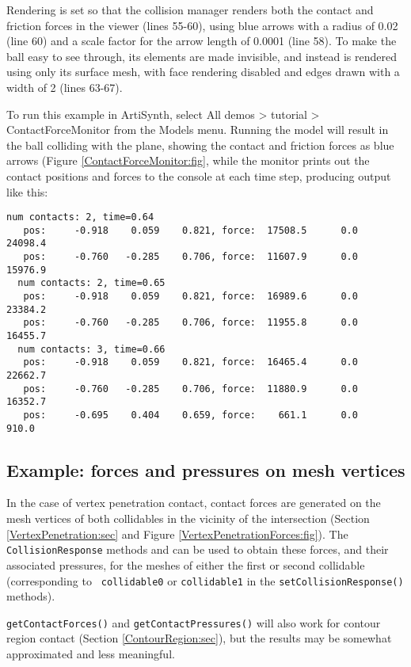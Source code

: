 Rendering is set so that the collision manager renders both the
contact and friction forces in the viewer (lines 55-60), using blue
arrows with a radius of 0.02 (line 60) and a scale factor for the
arrow length of 0.0001 (line 58). To make the ball easy to see
through, its elements are made invisible, and instead is rendered
using only its surface mesh, with face rendering disabled and edges
drawn with a width of 2 (lines 63-67).

To run this example in ArtiSynth, select {\sf All demos > tutorial >
ContactForceMonitor} from the {\sf Models} menu. Running the model
will result in the ball colliding with the plane, showing the contact
and friction forces as blue arrows
(Figure \ref{ContactForceMonitor:fig}, while the monitor prints out
the contact positions and forces to the console at each time step,
producing output like this:
%
\begin{lstlisting}[]
  num contacts: 2, time=0.64
   pos:     -0.918    0.059    0.821, force:  17508.5      0.0  24098.4
   pos:     -0.760   -0.285    0.706, force:  11607.9      0.0  15976.9
  num contacts: 2, time=0.65
   pos:     -0.918    0.059    0.821, force:  16989.6      0.0  23384.2
   pos:     -0.760   -0.285    0.706, force:  11955.8      0.0  16455.7
  num contacts: 3, time=0.66
   pos:     -0.918    0.059    0.821, force:  16465.4      0.0  22662.7
   pos:     -0.760   -0.285    0.706, force:  11880.9      0.0  16352.7
   pos:     -0.695    0.404    0.659, force:    661.1      0.0    910.0
\end{lstlisting}
%

\subsection{Example: forces and pressures on mesh vertices}

In the case of vertex penetration contact, contact forces are generated on the
mesh vertices of both collidables in the vicinity of the intersection (Section
\ref{VertexPenetration:sec} and Figure \ref{VertexPenetrationForces:fig}).
The {\tt CollisionResponse} methods
and
can be used to obtain these forces, and their associated pressures, for the
meshes of either the first or second collidable (corresponding to {\tt
collidable0} or {\tt collidable1} in the {\tt setCollisionResponse()} methods).

\begin{sideblock}
{\tt getContactForces()} and {\tt getContactPressures()} will also work for
contour region contact (Section \ref{ContourRegion:sec}), but the results may
be somewhat approximated and less meaningful.
\end{sideblock}

